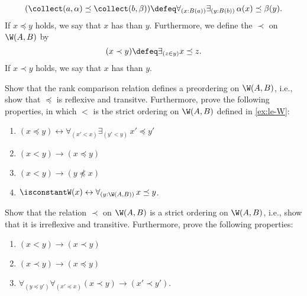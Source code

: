 \begin{exercises}
  \begin{equation*}
    (\collect(a,\alpha)\preceq\collect(b,\beta)) \defeq \forall_{(x:B(a))}\exists_{(y:B(b))}\,\alpha(x)\preceq \beta(y).
  \end{equation*}
  If $x\preceq y$ holds, we say that $x$ has  than $y$. Furthermore, we define the  ${\prec}$ on $\W(A,B)$ by
  \begin{equation*}
    (x\prec y)\defeq \exists_{(z\in y)}x\preceq z.
  \end{equation*}
  If $x\prec y$ holds, we say that $x$ has  than $y$.
  \begin{subexenum}
  \item Show that the rank comparison relation defines a preordering on $\W(A,B)$, i.e., show that $\preceq$ is reflexive and transitve. Furthermore, prove the following properties, in which $<$ is the strict ordering on $\W(A,B)$ defined in \cref{ex:le-W}:
    \begin{enumerate}
    \item $(x \preceq y) \leftrightarrow \forall_{(x'<x)}\exists_{(y'<y)}\,x'\preceq y'$
    \item $(x < y)\to (x\preceq y)$
    \item $(x < y) \to (y \npreceq x)$
    \item $\isconstantW(x)\leftrightarrow \forall_{(y:\W(A,B))}\,x \preceq y$.
    \end{enumerate}
  \item Show that the relation $\prec$ on $\W(A,B)$ is a strict ordering on $\W(A,B)$, i.e., show that it is irreflexive and transitive. Furthermore, prove the following properties:
    \begin{enumerate}
    \item $(x < y)\to (x\prec y)$
    \item $(x \prec y)\to (x\preceq y)$
    \item $\forall_{(y\preceq y')}\forall_{(x'\preceq x)}(x\prec y)\to (x'\prec y')$.
    \end{enumerate}
  \end{subexenum}

\end{exercises}
